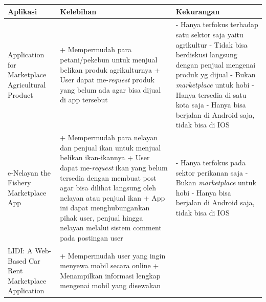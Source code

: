 \documentclass[a4paper]{article}
\begin{document}
\begin{centering}
\begin{longtable}{|p{3cm}|p{5cm}|p{5cm}|}
    \hline
    Aplikasi & Kelebihan                                                                                                                 & Kekurangan \\
    \hline
    Application for Marketplace Agricultural Product
             & + Mempermudah para petani/pekebun untuk menjual belikan produk agrikulturnya \newline
    + User dapat me-\textit{request} produk yang belum ada agar bisa dijual di app tersebut \newline
             & - Hanya terfokus terhadap satu sektor saja yaitu agrikultur \newline
    - Tidak bisa berdiskusi langsung dengan penjual mengenai produk yg dijual \newline
    - Bukan \textit{marketplace} untuk hobi \newline
    - Hanya tersedia di satu kota saja \newline
    - Hanya bisa berjalan di Android saja, tidak bisa di IOS                                                                                     \\
    \hline
    e-Nelayan the Fishery Marketplace App
             & + Mempermudah para nelayan dan penjual ikan untuk menjual belikan ikan-ikannya \newline
    + User dapat me-\textit{request} ikan yang belum tersedia dengan membuat post agar bisa dilihat langsung oleh nelayan atau penjual ikan \newline
    + App ini dapat menghubungankan pihak user, penjual hingga nelayan melalui sistem comment pada postingan user \newline
             & - Hanya terfokus pada sektor perikanan saja \newline
    - Bukan \textit{marketplace} untuk hobi \newline
    - Hanya bisa berjalan di Android saja, tidak bisa di IOS                                                                                     \\
    \hline
    LIDI: A Web-Based Car Rent Marketplace Application
             & + Mempermudah user yang ingin menyewa mobil secara online \newline
    + Menampilkan informasi lengkap mengenai mobil yang disewakan \newline

\end{longtable}
\end{centering}
\end{document}
